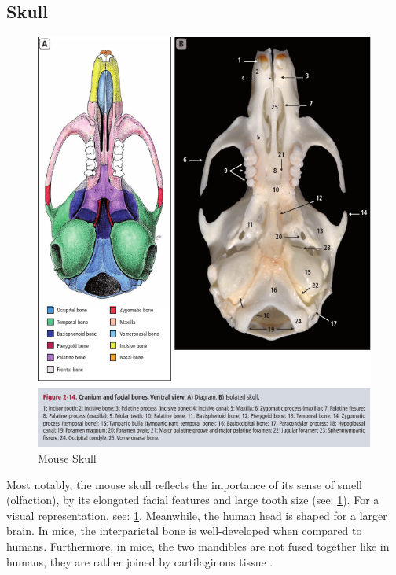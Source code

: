 \subsection{Skull}\label{s:b-mouse-skull}
\begin{figure}[h]
	\centerline{
		\includegraphics[scale=0.6]{images/mouseSkull.png}}
	\caption{Mouse Skull \cite{ruberteBridgingMouseHuman2023}}\label{fig:mouseSkull}
\end{figure}

\noindent
Most notably, the mouse skull reflects the importance of its sense of smell (olfaction),
by its elongated facial features and large tooth size (see: \cref{fig:mouseSkull}).
For a visual representation, see: \cref{fig:mouseSkull}.
Meanwhile, the human head is shaped for a larger brain.
In mice, the interparietal bone is well-developed when compared to humans.
Furthermore, in mice, the two mandibles are not fused together like in humans,
they are rather joined by cartilaginous tissue \cite{jeromeSkeletalSystem2018,halleOpenAnatomyBrowser2017,platzerTaschenatlasAnatomieBd2013}.

